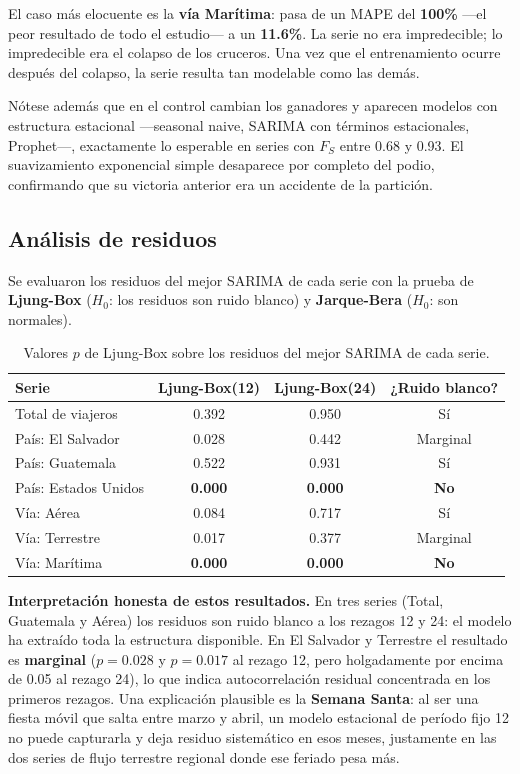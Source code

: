 \documentclass[12pt,letterpaper]{article}
\newcommand{\subseccion}[1]{\subsection{#1}}
\begin{document}
El caso más elocuente es la \textbf{vía Marítima}: pasa de un MAPE del \textbf{100\%} ---el
peor resultado de todo el estudio--- a un \textbf{11.6\%}. La serie no era impredecible; lo
impredecible era el colapso de los cruceros. Una vez que el entrenamiento ocurre después del
colapso, la serie resulta tan modelable como las demás.

Nótese además que en el control cambian los ganadores y aparecen modelos con estructura
estacional ---seasonal naive, SARIMA con términos estacionales, Prophet---, exactamente lo
esperable en series con $F_S$ entre 0.68 y 0.93. El suavizamiento exponencial simple desaparece
por completo del podio, confirmando que su victoria anterior era un accidente de la partición.

\subseccion{Análisis de residuos}

Se evaluaron los residuos del mejor SARIMA de cada serie con la prueba de \textbf{Ljung-Box}
($H_0$: los residuos son ruido blanco) y \textbf{Jarque-Bera} ($H_0$: son normales).

\begin{table}[H]
\centering
\small
\begin{tabular}{lccc}
\toprule
\textbf{Serie} & \textbf{Ljung-Box(12)} & \textbf{Ljung-Box(24)} & \textbf{¿Ruido blanco?} \\
\midrule
Total de viajeros      & 0.392 & 0.950 & Sí \\
País: El Salvador      & 0.028 & 0.442 & Marginal \\
País: Guatemala        & 0.522 & 0.931 & Sí \\
País: Estados Unidos   & \textbf{0.000} & \textbf{0.000} & \textbf{No} \\
Vía: Aérea             & 0.084 & 0.717 & Sí \\
Vía: Terrestre         & 0.017 & 0.377 & Marginal \\
Vía: Marítima          & \textbf{0.000} & \textbf{0.000} & \textbf{No} \\
\bottomrule
\end{tabular}
\caption{Valores $p$ de Ljung-Box sobre los residuos del mejor SARIMA de cada serie.}
\end{table}

\textbf{Interpretación honesta de estos resultados.} En tres series (Total, Guatemala y Aérea)
los residuos son ruido blanco a los rezagos 12 y 24: el modelo ha extraído toda la estructura
disponible. En El Salvador y Terrestre el resultado es \textbf{marginal} ($p = 0.028$ y
$p = 0.017$ al rezago 12, pero holgadamente por encima de 0.05 al rezago 24), lo que indica
autocorrelación residual concentrada en los primeros rezagos. Una explicación plausible es la
\textbf{Semana Santa}: al ser una fiesta móvil que salta entre marzo y abril, un modelo
estacional de período fijo 12 no puede capturarla y deja residuo sistemático en esos meses,
justamente en las dos series de flujo terrestre regional donde ese feriado pesa más.
\end{document}

